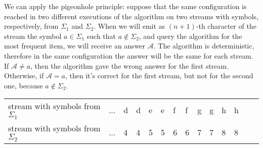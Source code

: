 We can apply the pigeonhole principle: suppose that the same configuration is reached in two different executions of the algorithm on two streams with symbols, respectively, from $\Sigma_1$ and $\Sigma_2$. When we will emit as $(n+1)$-th character of the stream the symbol $a \in \Sigma_1$ such that $a \notin \Sigma_2$, and query the algorithm for the most frequent item, we will receive an answer $\mathcal{A}$. The algorithm is deterministic, therefore in the same configuration the answer will be the same for each stream. If $\mathcal{A} \neq a$, then the algorithm gave the wrong answer for the first stream. Otherwise, if $\mathcal{A} = a$, then it's correct for the first stream, but not for the second one, because $a \notin \Sigma_2$.

\begin{table}[h]
  \centering
  \begin{tabular}{l|l|l|l|l|l|l|l|l|l|l|l|l|l|}
    \cline{2-12}
    stream with symbols from $\Sigma_1$ & ... & d & d & e & e & f & f & g & g & h & h \\ \cline{2-12} 
    stream with symbols from $\Sigma_2$ & ... & 4 & 4 & 5 & 5 & 6 & 6 & 7 & 7 & 8 & 8 \\ \cline{2-12} 
  \end{tabular}
\end{table}
